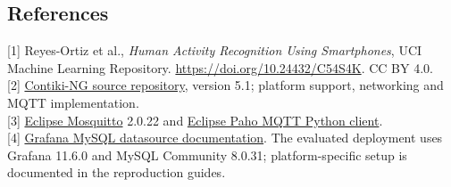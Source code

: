 \documentclass[11pt,a4paper]{article}
\newcommand{\sub}[1]{\subsection*{\normalsize #1}}
\begin{document}
\sub{References}
{\footnotesize\raggedright
[1] Reyes-Ortiz et al., \emph{Human Activity Recognition Using Smartphones}, UCI Machine Learning Repository. \url{https://doi.org/10.24432/C54S4K}. CC BY 4.0.\\[3pt]
[2] \href{https://github.com/contiki-ng/contiki-ng}{Contiki-NG source repository}, version 5.1; platform support, networking and MQTT implementation.\\[3pt]
[3] \href{https://mosquitto.org/}{Eclipse Mosquitto} 2.0.22 and \href{https://eclipse.dev/paho/clients/python/docs/}{Eclipse Paho MQTT Python client}.\\[3pt]
[4] \href{https://grafana.com/docs/grafana/latest/datasources/mysql/}{Grafana MySQL datasource documentation}. The evaluated deployment uses Grafana 11.6.0 and MySQL Community 8.0.31; platform-specific setup is documented in the reproduction guides.
}
\end{document}
